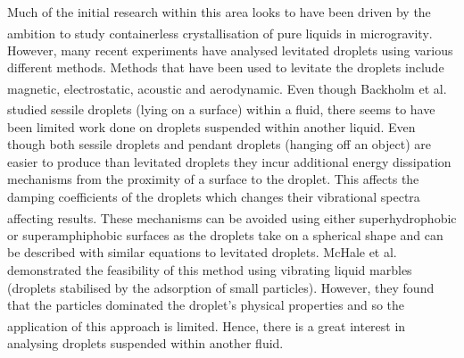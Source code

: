\documentclass{physics_article_B}
\begin{document}
Much of the initial research within this area looks to have been driven by the ambition to study containerless crystallisation of pure liquids in microgravity\textsuperscript{\cite{wilkes}}. However, many recent experiments have analysed levitated droplets using various different methods. Methods that have been used to levitate the droplets include magnetic\textsuperscript{\cite{hill}}, electrostatic\textsuperscript{\cite{mugele}}, acoustic\textsuperscript{\cite{trinh}} and aerodynamic\textsuperscript{\cite{benmore}}. Even though Backholm et al. studied sessile droplets (lying on a surface) within a fluid\textsuperscript{\cite{Backholm2017}}, there seems to have been limited work done on droplets suspended within another liquid. Even though both sessile droplets and pendant droplets (hanging off an object) are easier to produce than levitated droplets they incur additional energy dissipation mechanisms from the proximity of a surface to the droplet. This affects the damping coefficients of the droplets which changes their vibrational spectra  affecting results\textsuperscript{\cite{sharp}}. These mechanisms can be avoided using either superhydrophobic or superamphiphobic surfaces as the droplets take on a spherical shape and can be described with similar equations to levitated droplets. McHale et al. demonstrated the feasibility of this method using vibrating liquid marbles (droplets stabilised by the adsorption of small particles). However, they found that the particles dominated the droplet's physical properties and so the application of this approach is limited\textsuperscript{\cite{mchale}}. Hence, there is a great interest in analysing droplets suspended within another fluid. 


\end{document}
